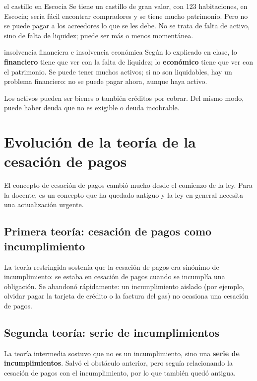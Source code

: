 \documentclass[12pt,oneside]{book}
\begin{document}
\begin{example}{el castillo en Escocia}
Se tiene un castillo de gran valor, con 123 habitaciones, en Escocia; sería fácil encontrar compradores y se tiene mucho patrimonio. Pero no se puede pagar a los acreedores lo que se les debe. No se trata de falta de activo, sino de falta de liquidez; puede ser más o menos momentánea.
\end{example}

\begin{definition}{insolvencia financiera e insolvencia económica}
Según lo explicado en clase, lo \textbf{financiero} tiene que ver con la falta de liquidez; lo \textbf{económico} tiene que ver con el patrimonio. Se puede tener muchos activos; si no son liquidables, hay un problema financiero: no se puede pagar ahora, aunque haya activo.
\end{definition}

Los activos pueden ser bienes o también créditos por cobrar. Del mismo modo, puede haber deuda que no es exigible o deuda incobrable.

\section{Evolución de la teoría de la cesación de pagos}

El concepto de cesación de pagos cambió mucho desde el comienzo de la ley. Para la docente, es un concepto que ha quedado antiguo y la ley en general necesita una actualización urgente.

\subsection{Primera teoría: cesación de pagos como incumplimiento}

La teoría restringida sostenía que la cesación de pagos era sinónimo de incumplimiento: se estaba en cesación de pagos cuando se incumplía una obligación. Se abandonó rápidamente: un incumplimiento aislado (por ejemplo, olvidar pagar la tarjeta de crédito o la factura del gas) no ocasiona una cesación de pagos.

\subsection{Segunda teoría: serie de incumplimientos}

La teoría intermedia sostuvo que no es un incumplimiento, sino una \textbf{serie de incumplimientos}. Salvó el obstáculo anterior, pero seguía relacionando la cesación de pagos con el incumplimiento, por lo que también quedó antigua.
\end{document}

